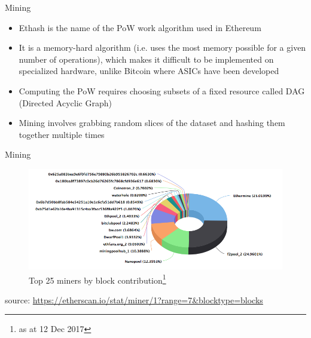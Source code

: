 \documentclass[9pt]{beamer}
\begin{document}

\begin{frame}{Mining}
	\begin{itemize}
		\item Ethash is the name of the PoW work algorithm used in Ethereum
		\item It is a memory-hard algorithm (i.e. uses the most memory possible for a given number of operations), which makes it difficult to be implemented on specialized hardware, unlike Bitcoin where ASICs have been developed
		\item Computing the PoW requires choosing subsets of a fixed resource called DAG (Directed Acyclic Graph)
		\item Mining involves grabbing random slices of the dataset and hashing them together multiple times
	\end{itemize}
\end{frame}


\begin{frame}{Mining}
	\begin{figure}[]
		\centering
		\includegraphics  [scale=0.25]{Images/eth-miners}
		\caption{Top 25 miners by block contribution\footnote{as at 12 Dec 2017}}
	\end{figure}
	\begin{scriptsize}
		source: \href{https://etherscan.io/stat/miner/1?range=7\&blocktype=blocks}{https://etherscan.io/stat/miner/1?range=7\&blocktype=blocks}
	\end{scriptsize}
\end{frame}

\end{document}
